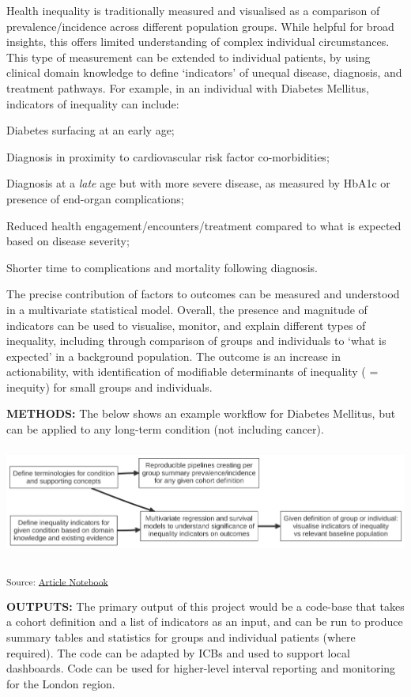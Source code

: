 \documentclass[
  letterpaper,
  DIV=11,
  numbers=noendperiod]{scrartcl}
\begin{document}
Health inequality is traditionally measured and visualised as a
comparison of prevalence/incidence across different population groups.
While helpful for broad insights, this offers limited understanding of
complex individual circumstances. This type of measurement can be
extended to individual patients, by using clinical domain knowledge to
define `indicators' of unequal disease, diagnosis, and treatment
pathways. For example, in an individual with Diabetes Mellitus,
indicators of inequality can include:

Diabetes surfacing at an early age;

Diagnosis in proximity to cardiovascular risk factor co-morbidities;

Diagnosis at a \emph{late} age but with more severe disease, as measured
by HbA1c or presence of end-organ complications;

Reduced health engagement/encounters/treatment compared to what is
expected based on disease severity;

Shorter time to complications and mortality following diagnosis.

The precise contribution of factors to outcomes can be measured and
understood in a multivariate statistical model. Overall, the presence
and magnitude of indicators can be used to visualise, monitor, and
explain different types of inequality, including through comparison of
groups and individuals to `what is expected' in a background population.
The outcome is an increase in actionability, with identification of
modifiable determinants of inequality ( = inequity) for small groups and
individuals.

\textbf{METHODS:} The below shows an example workflow for Diabetes
Mellitus, but can be applied to any long-term condition (not including
cancer).

\includegraphics[width=6in,height=1.41in]{index_files/figure-latex/mermaid-figure-5.png}

\textsubscript{Source:
\href{https://d3london.github.io/sde_aic_docs/index.qmd.html}{Article
Notebook}}

\textbf{OUTPUTS:} The primary output of this project would be a
code-base that takes a cohort definition and a list of indicators as an
input, and can be run to produce summary tables and statistics for
groups and individual patients (where required). The code can be adapted
by ICBs and used to support local dashboards. Code can be used for
higher-level interval reporting and monitoring for the London region.
\end{document}

